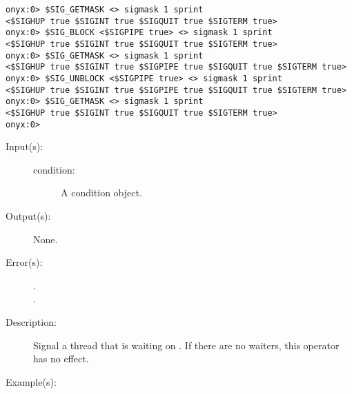 \begin{description}
\begin{description}
\begin{verbatim}
onyx:0> $SIG_GETMASK <> sigmask 1 sprint
<$SIGHUP true $SIGINT true $SIGQUIT true $SIGTERM true>
onyx:0> $SIG_BLOCK <$SIGPIPE true> <> sigmask 1 sprint
<$SIGHUP true $SIGINT true $SIGQUIT true $SIGTERM true>
onyx:0> $SIG_GETMASK <> sigmask 1 sprint
<$SIGHUP true $SIGINT true $SIGPIPE true $SIGQUIT true $SIGTERM true>
onyx:0> $SIG_UNBLOCK <$SIGPIPE true> <> sigmask 1 sprint
<$SIGHUP true $SIGINT true $SIGPIPE true $SIGQUIT true $SIGTERM true>
onyx:0> $SIG_GETMASK <> sigmask 1 sprint
<$SIGHUP true $SIGINT true $SIGQUIT true $SIGTERM true>
onyx:0>
		\end{verbatim}
	\end{description}
\label{systemdict:signal}
\item[{\onyxop{condition}{signal}{--}}: ]
	\begin{description}\item[]
	\item[Input(s): ]
		\begin{description}\item[]
		\item[condition: ]
			A condition object.
		\end{description}
	\item[Output(s): ] None.
	\item[Error(s): ]
		\begin{description}\item[]
		\item[.]
		\item[.]
		\end{description}
	\item[Description: ]
		Signal a thread that is waiting on .  If there
		are no waiters, this operator has no effect.
	\item[Example(s): ]\begin{verbatim}


\end{verbatim}
\end{description}
\end{description}
